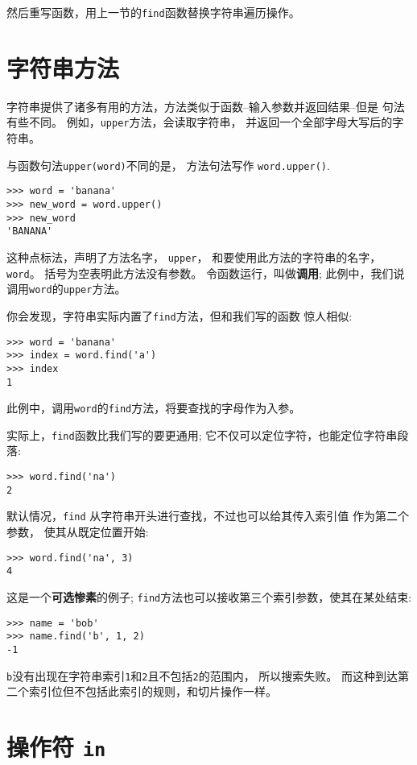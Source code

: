 \documentclass[10pt]{book}
\begin{document}
然后重写函数，用上一节的{\tt find}函数替换字符串遍历操作。


\section{字符串方法}
\label{optional}
字符串提供了诸多有用的方法，方法类似于函数--输入参数并返回结果--但是
句法有些不同。
例如，{\tt upper}方法，会读取字符串，
并返回一个全部字母大写后的字符串。

与函数句法{\tt upper(word)}不同的是，
方法句法写作 {\tt word.upper()}.

\begin{verbatim}
>>> word = 'banana'
>>> new_word = word.upper()
>>> new_word
'BANANA'
\end{verbatim}
%
这种点标法，声明了方法名字， {\tt upper}，
和要使用此方法的字符串的名字，{\tt word}。
括号为空表明此方法没有参数。
令函数运行，叫做{\bf 调用};
此例中，我们说调用{\tt word}的{\tt upper}方法。

你会发现，字符串实际内置了{\tt find}方法，但和我们写的函数
惊人相似:

\begin{verbatim}
>>> word = 'banana'
>>> index = word.find('a')
>>> index
1
\end{verbatim}
%
此例中，调用{\tt word}的{\tt find}方法，将要查找的字母作为入参。

实际上，{\tt find}函数比我们写的要更通用;
它不仅可以定位字符，也能定位字符串段落:

\begin{verbatim}
>>> word.find('na')
2
\end{verbatim}
%
默认情况，{\tt find} 从字符串开头进行查找，不过也可以给其传入索引值
作为第二个参数，
使其从既定位置开始:

\begin{verbatim}
>>> word.find('na', 3)
4
\end{verbatim}
%
这是一个{\bf 可选惨素}的例子;
{\tt find}方法也可以接收第三个索引参数，使其在某处结束:

\begin{verbatim}
>>> name = 'bob'
>>> name.find('b', 1, 2)
-1
\end{verbatim}
%
{\tt b}没有出现在字符串索引{\tt 1}和{\tt 2}且不包括{\tt 2}的范围内，
所以搜索失败。
而这种到达第二个索引位但不包括此索引的规则，和切片操作一样。


\section{操作符 {\tt in}}
\label{inboth}
\end{document}
